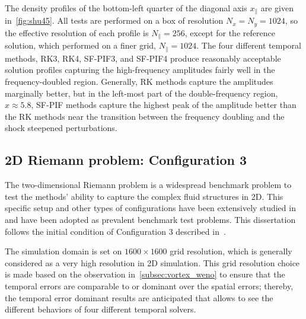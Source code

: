 The density profiles of the bottom-left quarter of the diagonal axis \( x_{\parallel} \)
are given in~\cref{fig:shu45}. All tests are performed on a box of resolution \( N_{x} = N_{y} = 1024 \),
so the effective resolution of each profile is \( N_{\parallel} = 256 \),
except for the reference solution, which performed on a finer grid, \( N_{\parallel} = 1024 \).
The four different temporal methods, RK3, RK4, SF-PIF3, and SF-PIF4 produce
reasonably acceptable solution profiles capturing the high-frequency amplitudes
fairly well in the frequency-doubled region.
Generally, RK methods capture the amplitudes marginally better,
but in the left-most part of the double-frequency region, \( x \approx 5.8 \),
SF-PIF methods capture the highest peak of the amplitude better than
the RK methods near the transition between the frequency 
doubling and the shock steepened perturbations.




\subsection{2D Riemann problem: Configuration 3}\label{subsec:2drp_c3_weno}

The two-dimensional Riemann problem is a widespread benchmark problem to test
the methods' ability to capture the complex fluid structures in 2D.
This specific setup and other types of configurations have been
extensively studied in~\cite{zhang1990conjecture, schulz1993classification, schulz1993numerical}
and have been adopted as prevalent benchmark test problems.
This dissertation follows the initial condition of Configuration 3
described in~\cite{don2016hybrid,lee2017piecewise,lee2021single,lee2021recursive}.

The simulation domain is set on \( 1600 \times 1600 \) grid resolution,
which is generally considered as a very high resolution in 2D simulation.
This grid resolution choice is made based on the observation in~\cref{subsec:vortex_weno}
to ensure that the temporal errors are comparable to or dominant over the spatial errors;
thereby, the temporal error dominant results are anticipated that allows
to see the different behaviors of four different temporal solvers.

